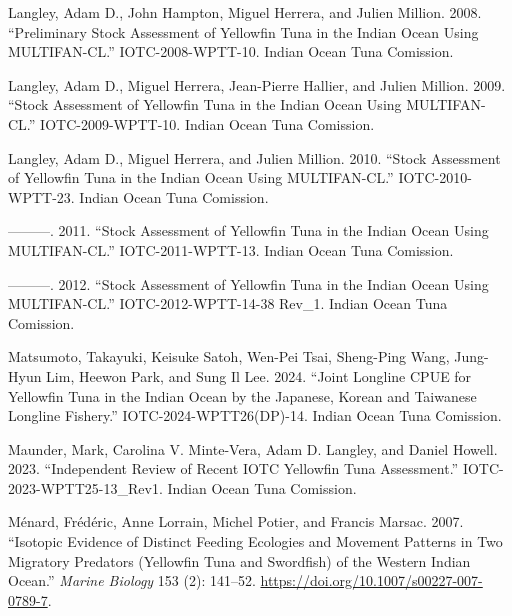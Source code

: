 \documentclass[
]{scrartcl}
\newlength{\cslhangindent}
\newenvironment{CSLReferences}[2] %
 {\begin{list}{}{%
  \setlength{\itemindent}{0pt}
  \setlength{\leftmargin}{0pt}
  \setlength{\parsep}{0pt}
  \ifodd #1
   \setlength{\leftmargin}{\cslhangindent}
   \setlength{\itemindent}{-1\cslhangindent}
  \fi
  \setlength{\itemsep}{#2\baselineskip}}}
 {\end{list}}
\begin{document}
\begin{CSLReferences}{1}{0}
Langley, Adam D., John Hampton, Miguel Herrera, and Julien Million.
2008. {``Preliminary Stock Assessment of Yellowfin Tuna in the {Indian
Ocean} Using {MULTIFAN-CL}.''} IOTC-2008-WPTT-10. Indian Ocean Tuna
Comission.

Langley, Adam D., Miguel Herrera, Jean-Pierre Hallier, and Julien
Million. 2009. {``Stock Assessment of Yellowfin Tuna in the {Indian
Ocean} Using {MULTIFAN-CL}.''} IOTC-2009-WPTT-10. Indian Ocean Tuna
Comission.

Langley, Adam D., Miguel Herrera, and Julien Million. 2010. {``Stock
Assessment of Yellowfin Tuna in the {Indian Ocean} Using
{MULTIFAN-CL}.''} IOTC-2010-WPTT-23. Indian Ocean Tuna Comission.

---------. 2011. {``Stock Assessment of Yellowfin Tuna in the {Indian
Ocean} Using {MULTIFAN-CL}.''} IOTC-2011-WPTT-13. Indian Ocean Tuna
Comission.

---------. 2012. {``Stock Assessment of Yellowfin Tuna in the {Indian
Ocean} Using {MULTIFAN-CL}.''} IOTC-2012-WPTT-14-38 Rev\_1. Indian Ocean
Tuna Comission.

Matsumoto, Takayuki, Keisuke Satoh, Wen-Pei Tsai, Sheng-Ping Wang,
Jung-Hyun Lim, Heewon Park, and Sung Il Lee. 2024. {``Joint Longline
{CPUE} for Yellowfin Tuna in the {Indian Ocean} by the {Japanese},
{Korean} and {Taiwanese} Longline Fishery.''} IOTC-2024-WPTT26(DP)-14.
Indian Ocean Tuna Comission.

Maunder, Mark, Carolina V. Minte-Vera, Adam D. Langley, and Daniel
Howell. 2023. {``Independent Review of Recent {IOTC} Yellowfin Tuna
Assessment.''} IOTC-2023-WPTT25-13\_Rev1. Indian Ocean Tuna Comission.

Ménard, Frédéric, Anne Lorrain, Michel Potier, and Francis Marsac. 2007.
{``Isotopic Evidence of Distinct Feeding Ecologies and Movement Patterns
in Two Migratory Predators (Yellowfin Tuna and Swordfish) of the Western
{Indian Ocean}.''} \emph{Marine Biology} 153 (2): 141--52.
\url{https://doi.org/10.1007/s00227-007-0789-7}.


\end{CSLReferences}
\end{document}
